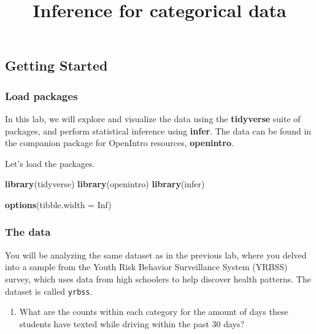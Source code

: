 \documentclass[
]{article}
\title{Inference for categorical data}
\author{}
\date{\vspace{-2.5em}}
\newenvironment{Shaded}{\begin{snugshade}}{\end{snugshade}}
\newcommand{\AttributeTok}[1]{\textcolor[rgb]{0.13,0.29,0.53}{#1}}
\newcommand{\ConstantTok}[1]{\textcolor[rgb]{0.56,0.35,0.01}{#1}}
\newcommand{\FunctionTok}[1]{\textcolor[rgb]{0.13,0.29,0.53}{\textbf{#1}}}
\newcommand{\NormalTok}[1]{#1}
\providecommand{\tightlist}{%
  \setlength{\itemsep}{0pt}\setlength{\parskip}{0pt}}
\begin{document}
\maketitle

\subsection{Getting Started}\label{getting-started}

\subsubsection{Load packages}\label{load-packages}

In this lab, we will explore and visualize the data using the
\textbf{tidyverse} suite of packages, and perform statistical inference
using \textbf{infer}. The data can be found in the companion package for
OpenIntro resources, \textbf{openintro}.

Let's load the packages.

\begin{Shaded}
\begin{Highlighting}[]
\FunctionTok{library}\NormalTok{(tidyverse)}
\FunctionTok{library}\NormalTok{(openintro)}
\FunctionTok{library}\NormalTok{(infer)}
\end{Highlighting}
\end{Shaded}

\begin{Shaded}
\begin{Highlighting}[]
\FunctionTok{options}\NormalTok{(}\AttributeTok{tibble.width =} \ConstantTok{Inf}\NormalTok{)}
\end{Highlighting}
\end{Shaded}

\subsubsection{The data}\label{the-data}

You will be analyzing the same dataset as in the previous lab, where you
delved into a sample from the Youth Risk Behavior Surveillance System
(YRBSS) survey, which uses data from high schoolers to help discover
health patterns. The dataset is called \texttt{yrbss}.

\begin{enumerate}
\def\labelenumi{\arabic{enumi}.}
\tightlist
\item
  What are the counts within each category for the amount of days these
  students have texted while driving within the past 30 days?
\end{enumerate}
\end{document}

